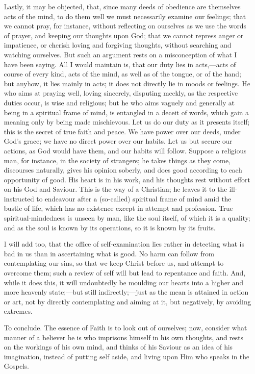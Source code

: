 Lastly, it may be objected, that, since many deeds of obedience are
themselves acts of the mind, to do them well we must necessarily examine
our feelings; that we cannot pray, for instance, without reflecting on
ourselves as we use the words of prayer, and keeping our thoughts upon
God; that we cannot repress anger or impatience, or cherish loving and
forgiving thoughts, without searching and watching ourselves. But such
an argument rests on a misconception of what I have been saying. All I
would maintain is, that our duty lies in acts,—acts of course of every
kind, acts of the mind, as well as of the tongue, or of the hand; but
anyhow, it lies mainly in acts; it does not directly lie in moods or
feelings. He who aims at praying well, loving sincerely, disputing
meekly, as the respective duties occur, is wise and religious; but he
who aims vaguely and generally at being in a spiritual frame of mind, is
entangled in a deceit of words, which gain a meaning only by being made
mischievous. Let us do our duty as it presents itself; this is the
secret of true faith and peace. We have power over our deeds, under
God's grace; we have no direct power over our habits. Let us but secure
our actions, as God would have them, and our habits will follow. Suppose
a religious man, for instance, in the society of strangers; he takes
things as they come, discourses naturally, gives his opinion soberly,
and does good according to each opportunity of good. His heart is in his
work, and his thoughts rest without effort on his God and Saviour. This
is the way of a Christian; he leaves it to the ill-instructed to
endeavour after a (so-called) spiritual frame of mind amid the bustle of
life, which has no existence except in attempt and profession. True
spiritual-mindedness is unseen by man, like the soul itself, of which it
is a quality; and as the soul is known by its operations, so it is known
by its fruits.

I will add too, that the office of self-examination lies rather in
detecting what is bad in us than in ascertaining what is good. No harm
can follow from contemplating our sins, so that we keep Christ before
us, and attempt to overcome them; such a review of self will but lead to
repentance and faith. And, while it does this, it will undoubtedly be
moulding our hearts into a higher and more heavenly state;—but still
indirectly;—just as the mean is attained in action or art, not by
directly contemplating and aiming at it, but negatively, by avoiding
extremes.

To conclude. The essence of Faith is to look out of ourselves; now,
consider what manner of a believer he is who imprisons himself in his
own thoughts, and rests on the workings of his own mind, and thinks of
his Saviour as an idea of his imagination, instead of putting self
aside, and living upon Him who speaks in the Gospels.

